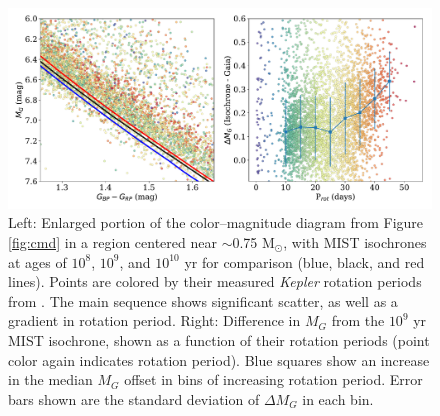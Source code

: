 \documentclass[preprint2]{aastex62}
\newcommand{\Kepler}{\textsl{Kepler}\xspace}
\begin{document}
\begin{figure}[]
\centering
\includegraphics[width=6.5in]{../figures/cmd_zoom}
\caption{Left: Enlarged portion of the color--magnitude diagram from Figure \ref{fig:cmd} in a region centered near $\sim$0.75 M$_\odot$, with MIST isochrones at ages of $10^8$, $10^9$, and $10^10$ yr for comparison (blue, black, and red lines). Points are colored by their measured \Kepler rotation periods from \citet{mcquillan2014}. The main sequence shows significant scatter, as well as a gradient in rotation period. Right: Difference in $M_G$ from the $10^9$ yr MIST isochrone, shown as a function of their rotation periods (point color again indicates rotation period). Blue squares show an increase in the median $M_G$ offset in bins of increasing rotation period. Error bars shown are the standard deviation of $\Delta M_G$ in each bin.
}
\label{fig:cmd_zoom}
\end{figure}







\end{document}
